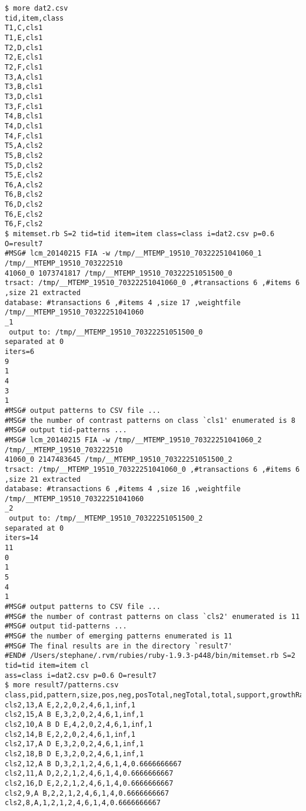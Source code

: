 \begin{Verbatim}[baselinestretch=0.7,frame=single]
$ more dat2.csv
tid,item,class
T1,C,cls1
T1,E,cls1
T2,D,cls1
T2,E,cls1
T2,F,cls1
T3,A,cls1
T3,B,cls1
T3,D,cls1
T3,F,cls1
T4,B,cls1
T4,D,cls1
T4,F,cls1
T5,A,cls2
T5,B,cls2
T5,D,cls2
T5,E,cls2
T6,A,cls2
T6,B,cls2
T6,D,cls2
T6,E,cls2
T6,F,cls2
$ mitemset.rb S=2 tid=tid item=item class=class i=dat2.csv p=0.6 O=result7
#MSG# lcm_20140215 FIA -w /tmp/__MTEMP_19510_70322251041060_1 /tmp/__MTEMP_19510_703222510
41060_0 1073741817 /tmp/__MTEMP_19510_70322251051500_0
trsact: /tmp/__MTEMP_19510_70322251041060_0 ,#transactions 6 ,#items 6 ,size 21 extracted 
database: #transactions 6 ,#items 4 ,size 17 ,weightfile /tmp/__MTEMP_19510_70322251041060
_1
 output to: /tmp/__MTEMP_19510_70322251051500_0
separated at 0
iters=6
9
1
4
3
1
#MSG# output patterns to CSV file ...
#MSG# the number of contrast patterns on class `cls1' enumerated is 8
#MSG# output tid-patterns ...
#MSG# lcm_20140215 FIA -w /tmp/__MTEMP_19510_70322251041060_2 /tmp/__MTEMP_19510_703222510
41060_0 2147483645 /tmp/__MTEMP_19510_70322251051500_2
trsact: /tmp/__MTEMP_19510_70322251041060_0 ,#transactions 6 ,#items 6 ,size 21 extracted 
database: #transactions 6 ,#items 4 ,size 16 ,weightfile /tmp/__MTEMP_19510_70322251041060
_2
 output to: /tmp/__MTEMP_19510_70322251051500_2
separated at 0
iters=14
11
0
1
5
4
1
#MSG# output patterns to CSV file ...
#MSG# the number of contrast patterns on class `cls2' enumerated is 11
#MSG# output tid-patterns ...
#MSG# the number of emerging patterns enumerated is 11
#MSG# The final results are in the directory `result7'
#END# /Users/stephane/.rvm/rubies/ruby-1.9.3-p448/bin/mitemset.rb S=2 tid=tid item=item cl
ass=class i=dat2.csv p=0.6 O=result7
$ more result7/patterns.csv
class,pid,pattern,size,pos,neg,posTotal,negTotal,total,support,growthRate,postProb
cls2,13,A E,2,2,0,2,4,6,1,inf,1
cls2,15,A B E,3,2,0,2,4,6,1,inf,1
cls2,10,A B D E,4,2,0,2,4,6,1,inf,1
cls2,14,B E,2,2,0,2,4,6,1,inf,1
cls2,17,A D E,3,2,0,2,4,6,1,inf,1
cls2,18,B D E,3,2,0,2,4,6,1,inf,1
cls2,12,A B D,3,2,1,2,4,6,1,4,0.6666666667
cls2,11,A D,2,2,1,2,4,6,1,4,0.6666666667
cls2,16,D E,2,2,1,2,4,6,1,4,0.6666666667
cls2,9,A B,2,2,1,2,4,6,1,4,0.6666666667
cls2,8,A,1,2,1,2,4,6,1,4,0.6666666667
\end{Verbatim}
